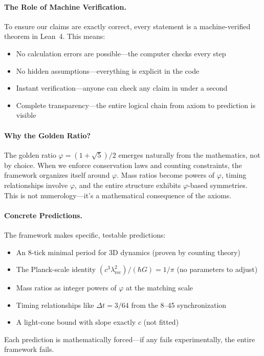 \documentclass[11pt,a4paper,twoside]{article}
\numberwithin{equation}{section}
\theoremstyle{customthm}
\theoremstyle{customdef}
\theoremstyle{customrem}
\begin{document}
\paragraph{The Role of Machine Verification.} To ensure our claims are exactly correct, every statement is a machine-verified theorem in Lean~4. This means:
\begin{itemize}[leftmargin=*,topsep=2pt,itemsep=2pt]
\item No calculation errors are possible—the computer checks every step
\item No hidden assumptions—everything is explicit in the code  
\item Instant verification—anyone can check any claim in under a second
\item Complete transparency—the entire logical chain from axiom to prediction is visible
\end{itemize}

\paragraph{Why the Golden Ratio?} The golden ratio $\varphi = (1+\sqrt{5})/2$ emerges naturally from the mathematics, not by choice. When we enforce conservation laws and counting constraints, the framework organizes itself around $\varphi$. Mass ratios become powers of $\varphi$, timing relationships involve $\varphi$, and the entire structure exhibits $\varphi$-based symmetries. This is not numerology—it's a mathematical consequence of the axioms.

\paragraph{Concrete Predictions.} The framework makes specific, testable predictions:
\begin{itemize}[leftmargin=*,topsep=2pt,itemsep=2pt]
\item An 8-tick minimal period for 3D dynamics (proven by counting theory)
\item The Planck-scale identity $(c^3\lambda_{\mathrm{rec}}^2)/(\hbar G) = 1/\pi$ (no parameters to adjust)
\item Mass ratios as integer powers of $\varphi$ at the matching scale
\item Timing relationships like $\Delta t = 3/64$ from the 8--45 synchronization
\item A light-cone bound with slope exactly $c$ (not fitted)
\end{itemize}
Each prediction is mathematically forced—if any fails experimentally, the entire framework fails.
\end{document}
